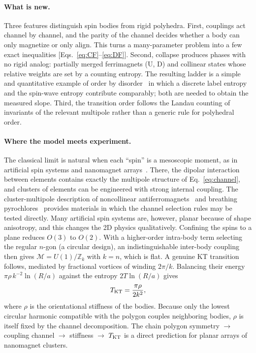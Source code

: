 \documentclass[pre,twocolumn,superscriptaddress,amsmath,amssymb,floatfix]{revtex4-2}
\begin{document}
\paragraph*{What is new.} Three features distinguish spin bodies from rigid polyhedra. First, couplings act channel by channel, and the parity of the channel decides whether a body can only magnetize or only align. This turns a many-parameter problem into a few exact inequalities [Eqs.~\eqref{eq:CF}--\eqref{eq:DF}]. Second, collapse produces phases with no rigid analog: partially merged ferrimagnets (U, D) and collinear states whose relative weights are set by a counting entropy. The resulting ladder is a simple and quantitative example of order by disorder~\cite{Villain1980,Henley1989} in which a discrete label entropy and the spin-wave entropy contribute comparably; both are needed to obtain the measured slope. Third, the transition order follows the Landau counting of invariants of the relevant multipole rather than a generic rule for polyhedral order.

\paragraph*{Where the model meets experiment.} The classical limit is natural when each ``spin'' is a mesoscopic moment, as in artificial spin systems and nanomagnet arrays~\cite{Heyderman2013,Skjaervo2020}. There, the dipolar interaction between elements contains exactly the multipole structure of Eq.~\eqref{eq:channel}, and clusters of elements can be engineered with strong internal coupling. The cluster-multipole description of noncollinear antiferromagnets~\cite{Suzuki2017} and breathing pyrochlores~\cite{Okamoto2013,Rau2016} provides materials in which the channel selection rules may be tested directly. Many artificial spin systems are, however, planar because of shape anisotropy, and this changes the 2D physics qualitatively. Confining the spins to a plane reduces $O(3)$ to $O(2)$. With a higher-order intra-body term selecting the regular $n$-gon (a circular design), an indistinguishable inter-body coupling then gives $\mathcal M=U(1)/\mathbb{Z}_k$ with $k=n$, which is flat. A genuine KT transition follows, mediated by fractional vortices of winding $2\pi/k$. Balancing their energy $\pi\rho\,k^{-2}\ln(R/a)$ against the entropy $2T\ln(R/a)$ gives
\begin{equation}
T_{\rm KT}=\frac{\pi\rho}{2k^2},
\label{eq:TKT}
\end{equation}
where $\rho$ is the orientational stiffness of the bodies. Because only the lowest circular harmonic compatible with the polygon couples neighboring bodies, $\rho$ is itself fixed by the channel decomposition. The chain polygon symmetry $\to$ coupling channel $\to$ stiffness $\to$ $T_{\rm KT}$ is a direct prediction for planar arrays of nanomagnet clusters.
\end{document}
